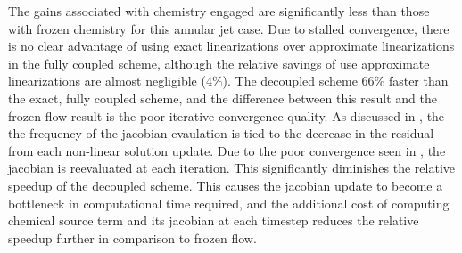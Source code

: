 The gains associated with chemistry engaged are significantly less than those
with frozen chemistry for this annular jet case.  Due to stalled convergence,
there is no clear advantage of using exact linearizations over approximate
linearizations in the fully coupled scheme, although the relative savings of use
approximate linearizations are almost negligible ($4\%$).  The decoupled scheme
66\% faster than the exact, fully coupled scheme, and the difference between
this result and the frozen flow result is the poor iterative convergence
quality.  As discussed in , the the frequency of
the jacobian evaulation is tied to the decrease in the residual from each
non-linear solution update.  Due to the poor convergence seen in
, the jacobian is reevaluated at each iteration.
This significantly diminishes the relative speedup of the decoupled scheme.
This causes the jacobian update to become a bottleneck in computational time
required, and the additional cost of computing chemical source term and its
jacobian at each timestep reduces the relative speedup further in comparison to
frozen flow.


